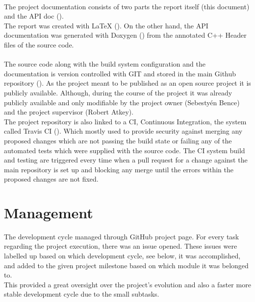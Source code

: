 \documentclass[]{report}
\begin{document}
\paragraph{ }
The project documentation consists of two parts the report itself (this document) and the API doc (\cite{APID}).
\\
The report was created with LaTeX (\cite{LATX}). On the other hand, the API documentation was generated with Doxygen (\cite{DOXY}) from the annotated C++ Header files of the source code.

\paragraph{ }
The source code along with the build system configuration and the documentation is version controlled with GIT and stored in the main  Github repository (\cite{REPO}).
As the project meant to be published as an open source project it is publicly available. Although, during the course of the project it was already publicly available and only modifiable by the project owner (Sebestyén Bence) and the project supervisor (Robert Atkey).
\\
The project repository is also linked to a CI, Continuous Integration, the system called Travis CI (\cite{TRAV}). Which mostly used to provide security against merging any proposed changes which are not passing the build state or failing any of the automated tests which were supplied with the source code. The CI system build and testing are triggered every time when a pull request for a change against the main repository is set up and blocking any merge until the errors within the proposed changes are not fixed.



\section{Management}

\paragraph{ }
The development cycle managed through GitHub project page. For every task regarding the project execution, there was an issue opened. These issues were labelled up based on which development cycle, see below, it was accomplished, and added to the given project milestone based on which module it was belonged to.
\\
This provided a great oversight over the project's evolution and also a faster more stable development cycle due to the small subtasks.
\end{document}
